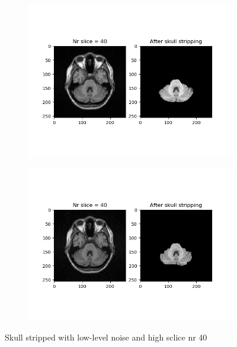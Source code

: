 \begin{figure}[H]
	\centering
	\begin{subfigure}[b]{0.35\linewidth}
		\includegraphics[scale=0.35]{figures/Module_08/M8_5.png}
	\end{subfigure}
		\begin{subfigure}[b]{0.35\linewidth}
		\includegraphics[scale=0.35]{figures/Module_08/M8_n5.png}
	\end{subfigure}
	\caption{Skull stripped with low-level noise and high sclice nr 40}
	\label{fig:figures/m08_5}
\end{figure}

